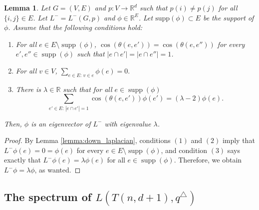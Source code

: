 \documentclass[a4paper,11pt]{article}
\theoremstyle{plain}
\newtheorem{lemma}[theorem]{\bf Lemma}
\theoremstyle{definition}
\newcommand{\Rea}{{\mathbb R}}
\DeclareMathOperator{\supp}{\text{supp}}
\begin{document}
\begin{lemma}\label{lemma:condition_for_eigenvector}
Let $G=(V,E)$ and $p:V\to \Rea^d$ such that $p(i)\neq p(j)$ for all $\{i,j\}\in E$. Let $L^{-}=L^{-}(G,p)$ and $\phi\in \Rea^{E}$. Let $\text{supp}(\phi)\subset E$ be the support of $\phi$. Assume that the following conditions hold:
\begin{enumerate}
    \item For all $e\in E\setminus \supp(\phi)$, $
        \cos(\theta(e,e'))=\cos(\theta(e,e''))
    $
    for every $e',e''\in \supp(\phi)$ such that $|e\cap e'|=|e\cap e''|=1$.
    \item For all $v\in V$,
   $
    \sum_{e\in E:\, v\in e} \phi(e)=0.
    $
    \item There is $\lambda\in \Rea$ such that for all $e\in\supp(\phi)$
    \[
        \sum_{e'\in E:\, |e\cap e'|=1} \cos(\theta(e,e'))\phi(e')=(\lambda-2)\phi(e).
    \]
\end{enumerate}
Then, $\phi$ is an eigenvector of $L^{-}$ with eigenvalue $\lambda$.
\end{lemma}
\begin{proof}
By Lemma \ref{lemma:down_laplacian}, conditions $(1)$ and $(2)$ imply that $L^{-}\phi(e)=0=\phi(e)$ for every $e\in E\setminus \supp(\phi)$, and condition $(3)$ says exactly that $L^{-}\phi(e)=\lambda\phi(e)$ for all $e\in\supp(\phi)$. Therefore, we obtain $L^{-}\phi=\lambda\phi$, as wanted.
\end{proof}



\subsection{The spectrum of $L(T(n,d+1),q^{\triangle})$}

\simplexrepeated*
\end{document}
